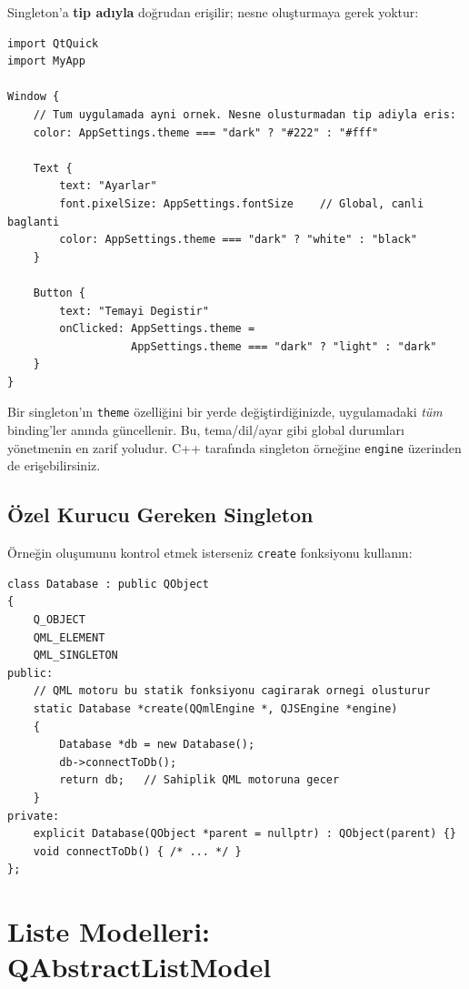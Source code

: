 \documentclass[11pt,a4paper]{article}
\newcommand{\kod}[1]{\texttt{\color{koyuGri}#1}}
\begin{document}
Singleton'a \textbf{tip adıyla} doğrudan erişilir; nesne oluşturmaya gerek yoktur:

\begin{lstlisting}[style=qmlstyle]
import QtQuick
import MyApp

Window {
    // Tum uygulamada ayni ornek. Nesne olusturmadan tip adiyla eris:
    color: AppSettings.theme === "dark" ? "#222" : "#fff"

    Text {
        text: "Ayarlar"
        font.pixelSize: AppSettings.fontSize    // Global, canli baglanti
        color: AppSettings.theme === "dark" ? "white" : "black"
    }

    Button {
        text: "Temayi Degistir"
        onClicked: AppSettings.theme =
                   AppSettings.theme === "dark" ? "light" : "dark"
    }
}
\end{lstlisting}

\begin{ipucukutu}
Bir singleton'ın \kod{theme} özelliğini bir yerde değiştirdiğinizde,
uygulamadaki \emph{tüm} binding'ler anında güncellenir. Bu, tema/dil/ayar gibi
global durumları yönetmenin en zarif yoludur. C++ tarafında singleton örneğine
\kod{engine} üzerinden de erişebilirsiniz.
\end{ipucukutu}

\subsection{Özel Kurucu Gereken Singleton}

Örneğin oluşumunu kontrol etmek isterseniz \kod{create} fonksiyonu kullanın:

\begin{lstlisting}
class Database : public QObject
{
    Q_OBJECT
    QML_ELEMENT
    QML_SINGLETON
public:
    // QML motoru bu statik fonksiyonu cagirarak ornegi olusturur
    static Database *create(QQmlEngine *, QJSEngine *engine)
    {
        Database *db = new Database();
        db->connectToDb();
        return db;   // Sahiplik QML motoruna gecer
    }
private:
    explicit Database(QObject *parent = nullptr) : QObject(parent) {}
    void connectToDb() { /* ... */ }
};
\end{lstlisting}

\section{Liste Modelleri: QAbstractListModel}
\end{document}

